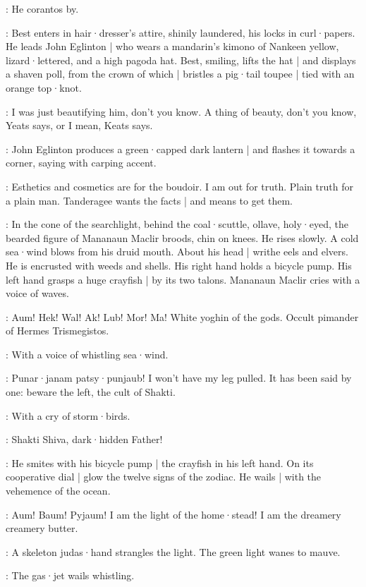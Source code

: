:
He corantos by.

:
Best enters in hair·dresser's attire,
shinily laundered,
his locks in curl·papers.
He leads John Eglinton |
who wears a mandarin's kimono of Nankeen yellow,
lizard·lettered,
and a high pagoda hat.
Best,
smiling,
lifts the hat |
and displays a shaven poll,
from the crown of which |
bristles a pig·tail toupee |
tied with an orange top·knot.

\Best:
I was just beautifying him,
don't you know.
A thing of beauty,
don't you know,
Yeats says,
or I mean,
Keats says.

:
John Eglinton produces a green·capped dark lantern |
and flashes it towards a corner,
saying with carping accent.

\JohnEglinton:
Esthetics and cosmetics are for the boudoir.
I am out for truth.
Plain truth for a plain man.
Tanderagee wants the facts |
and means to get them.%

:
In the cone of the searchlight,
behind the coal·scuttle,
ollave,
holy·eyed,
the bearded figure of Mananaun Maclir broods,
chin on knees.
He rises slowly.
A cold sea·wind blows from his druid mouth.
About his head |
writhe eels and elvers.
He is encrusted with weeds and shells.
His right hand holds a bicycle pump.
His left hand grasps a huge crayfish |
by its two talons.
Mananaun Maclir cries with a voice of waves.

\MananaunMaclir:
Aum!
Hek!
Wal!
Ak!
Lub!
Mor!
Ma!
White yoghin of the gods.
Occult pimander of Hermes Trismegistos.

:
With a voice of whistling sea·wind.

\MananaunMaclir:
Punar·janam patsy·punjaub!
I won't have my leg pulled.
It has been said by one:
beware the left,
the cult of Shakti.

:
With a cry of storm·birds.

\MananaunMaclir:
Shakti Shiva,
dark·hidden Father!

:
He smites with his bicycle pump |
the crayfish in his left hand.
On its cooperative dial |
glow the twelve signs of the zodiac.
He wails |
with the vehemence of the ocean.

\MananaunMaclir:
Aum!
Baum!
Pyjaum!
I am the light of the home·stead!
I am the dreamery creamery butter.

:
A skeleton judas·hand strangles the light.
The green light wanes to mauve.

:
The gas·jet wails whistling.

